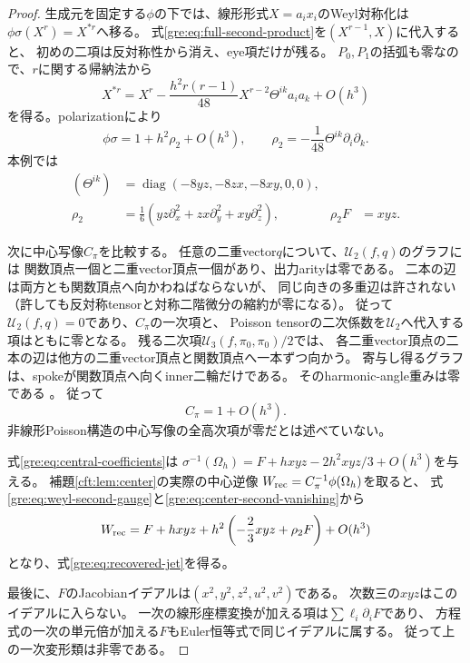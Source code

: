 \begin{proof}
生成元を固定する$\phi$の下では、線形形式$X=a_i x_i$のWeyl対称化は
$\phi\sigma(X^r)=X^{*r}$へ移る。
式\eqref{gre:eq:full-second-product}を$(X^{r-1},X)$に代入すると、
初めの二項は反対称性から消え、eye項だけが残る。
$P_0,P_1$の括弧も零なので、$r$に関する帰納法から
\[
 X^{*r}=X^r-\frac{h^2r(r-1)}{48}
 X^{r-2}\Theta^{ik}a_i a_k+O(h^3)
\]
を得る。polarizationにより
\begin{equation}\label{gre:eq:weyl-second-gauge}
 \phi\sigma=1+h^2\rho_2+O(h^3),\qquad
 \rho_2=-\frac1{48}\Theta^{ik}\partial_i\partial_k.
\end{equation}
本例では
\begin{equation}\label{gre:eq:theta-fermat}
 \begin{aligned}
 (\Theta^{ik})&=\operatorname{diag}(-8yz,-8zx,-8xy,0,0),\\
 \rho_2&=\frac16\left(yz\partial_x^2+zx\partial_y^2+xy\partial_z^2\right),
 &\rho_2F&=xyz.
 \end{aligned}
\end{equation}

次に中心写像$C_\pi$を比較する。
任意の二重vector$q$について、$\mathcal U_2(f,q)$のグラフには
関数頂点一個と二重vector頂点一個があり、出力arityは零である。
二本の辺は両方とも関数頂点へ向かわねばならないが、
同じ向きの多重辺は許されない（許しても反対称tensorと対称二階微分の縮約が零になる）。
従って$\mathcal U_2(f,q)=0$であり、$C_\pi$の一次項と、
Poisson tensorの二次係数を$\mathcal U_2$へ代入する項はともに零となる。
残る二次項$\mathcal U_3(f,\pi_0,\pi_0)/2$では、
各二重vector頂点の二本の辺は他方の二重vector頂点と関数頂点へ一本ずつ向かう。
寄与し得るグラフは、spokeが関数頂点へ向くinner二輪だけである。
そのharmonic-angle重みは零である
\cite[Section~1.3, Theorem]{GRShoikhet}。
従って
\begin{equation}\label{gre:eq:center-second-vanishing}
 C_\pi=1+O(h^3).
\end{equation}
非線形Poisson構造の中心写像の全高次項が零だとは述べていない。

式\eqref{gre:eq:central-coefficients}は
$\sigma^{-1}(\Omega_h)=F+hxyz-2h^2xyz/3+O(h^3)$を与える。
補題\ref{cft:lem:center}の実際の中心逆像
$W_{\rm rec}=C_\pi^{-1}\phi(\Omega_h)$を取ると、
式\eqref{gre:eq:weyl-second-gauge}と\eqref{gre:eq:center-second-vanishing}から
\[
 W_{\rm rec}=F+hxyz+h^2\left(-\frac23xyz+\rho_2F\right)+O(h^3)
\]
となり、式\eqref{gre:eq:recovered-jet}を得る。

最後に、$F$のJacobianイデアルは$(x^2,y^2,z^2,u^2,v^2)$である。
次数三の$xyz$はこのイデアルに入らない。
一次の線形座標変換が加える項は$\sum\ell_i\partial_iF$であり、
方程式の一次の単元倍が加える$F$もEuler恒等式で同じイデアルに属する。
従って上の一次変形類は非零である。
\end{proof}

